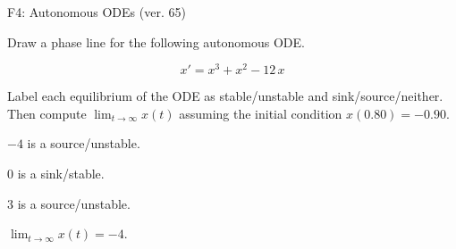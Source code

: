 \begin{exercise}
  \begin{exerciseTitle}F4: Autonomous ODEs (ver. 65)\end{exerciseTitle}
  \begin{exerciseStatement}
    

      Draw a phase line for the following 
      autonomous ODE.
    

    
\[x'= x^{3} + x^{2} - 12 \, x\]

    

      Label each equilibrium of the ODE
      as stable/unstable and sink/source/neither.
      Then compute \(\lim_{t\to\infty}x(t)\)
      assuming the initial condition
      \(x( 0.80 )= -0.90\).
    

  \end{exerciseStatement}
  \begin{exerciseAnswer}
    

      \(-4\) is a source/unstable.
      
        \(0\) is a sink/stable.
      
      \(3\) is a source/unstable.
    

    

      \(\lim_{t\to\infty}x(t)=-4\).
    

  \end{exerciseAnswer}
\end{exercise}